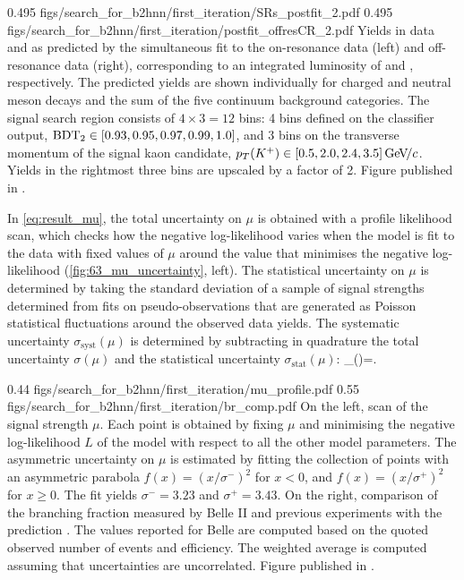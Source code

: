{0.495}
{figs/search_for_b2hnn/first_iteration/SRs_postfit_2.pdf}
{0.495}
{figs/search_for_b2hnn/first_iteration/postfit_offresCR_2.pdf}
{
Yields in data and as predicted by the simultaneous fit to the on-resonance data (left) and off-resonance data (right), corresponding to an integrated luminosity of \lumionpartial and \lumioffpartial, respectively.
The predicted yields are shown individually for charged and neutral \B meson decays and the sum of the five continuum background categories.
The signal search region consists of $4\times3=12$ bins: 4 bins defined on the classifier output, $\mathrm{BDT_2}\in[0.93, 0.95, 0.97, 0.99, 1.0]$, and 3 bins on the transverse momentum of the signal kaon candidate, $p_T(K^+)\in[0.5, 2.0, 2.4, 3.5]{\mathrm{\,Ge\kern -0.1em V\!/}c}$.
Yields in the rightmost three bins are upscaled by a factor of 2.
Figure published in \cite{Belle-II:2021rof}.
}

In \cref{eq:result_mu}, the total uncertainty on $\mu$ is obtained with a profile likelihood scan, which checks how the negative log-likelihood varies when the model is fit to the data with fixed values of $\mu$ around the value that minimises the negative log-likelihood (\cref{fig:63_mu_uncertainty}, left).
The statistical uncertainty on $\mu$ is determined by taking the standard deviation of a sample of signal strengths determined from fits on pseudo-observations that are generated as Poisson statistical fluctuations around the observed data yields.
The systematic uncertainty $\sigma_{\mathrm{syst}}(\mu)$ is determined by subtracting in quadrature the total uncertainty $\sigma(\mu)$ and the statistical uncertainty $\sigma_{\mathrm{stat}}(\mu)$:
\be
\sigma_{}(\mu)=.
\ee

{0.44}
{figs/search_for_b2hnn/first_iteration/mu_profile.pdf}
{0.55}
{figs/search_for_b2hnn/first_iteration/br_comp.pdf}
{
On the left, scan of the signal strength $\mu$.
Each point is obtained by fixing $\mu$ and minimising the negative log-likelihood $L$ of the \pyhf model with respect to all the other model parameters.
The asymmetric uncertainty on $\mu$ is estimated by fitting the collection of points with an asymmetric parabola $f(x)=(x/\sigma^-)^2$ for $x<0$, and $f(x)=(x/\sigma^+)^2$ for $x\ge0$.
The fit yields $\sigma^-=3.23$ and $\sigma^+=3.43$.
On the right, comparison of the \BKpnn branching fraction measured by Belle II and previous experiments \cite{BaBar:2013npw,Belle:2013tnz,Belle:2017oht} with the \SM prediction \cite{BLAKE201750}.
The values reported for Belle are computed based on the quoted observed number of events and efficiency.
The weighted average is computed assuming that uncertainties are uncorrelated.
Figure published in \cite{Belle-II:2021rof}.
}

